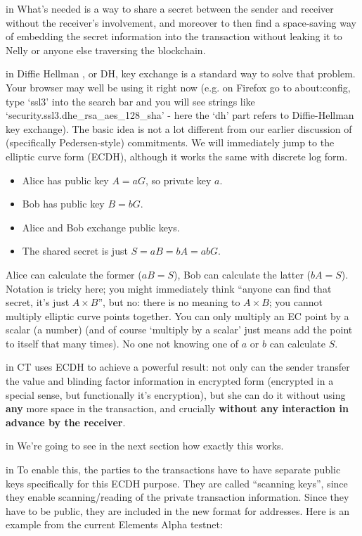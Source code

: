 \documentclass[10pt,a4paper]{article}
\begin{document}
 in \noindent What's needed is a way to share a secret between the sender and receiver without the receiver's involvement, and moreover to then find a space-saving way of embedding the secret information into the transaction without leaking it to Nelly or anyone else traversing the blockchain.

 in \noindent Diffie Hellman \cite{dhke}, or DH, key exchange is a standard way to solve that problem. Your browser may well be using it right now (e.g. on Firefox go to about:config, type `ssl3' into the search bar and you will see strings like `security.ssl3.dhe\_rsa\_aes\_128\_sha' - here the `dh' part refers to Diffie-Hellman key exchange). The basic idea is not a lot different from our earlier discussion of (specifically Pedersen-style) commitments. We will immediately jump to the elliptic curve form (ECDH), although it works the same with discrete log form.

\begin{itemize}
\item Alice has public key $A = aG$, so private key $a$.
\item Bob has public key $B = bG$.
\item Alice and Bob exchange public keys.
\item The shared secret is just $S = aB = bA = abG$.
\end{itemize}

Alice can calculate the former ($aB = S$), Bob can calculate the latter ($bA = S$). Notation is tricky here; you might immediately think ``anyone can find that secret, it's just $A \times B$'', but no: there is no meaning to $A \times B$; you cannot multiply elliptic curve points together. You can only multiply an EC point by a scalar (a number) (and of course `multiply by a scalar' just means add the point to itself that many times). No one not knowing one of $a$ or $b$ can calculate $S$.

 in \noindent CT uses ECDH to achieve a powerful result: not only can the sender transfer the value and blinding factor information in encrypted form (encrypted in a special sense, but functionally it's encryption), but she can do it without using \textbf{any} more space in the transaction, and crucially \textbf{without any interaction in advance by the receiver}.

 in \noindent We're going to see in the next section how exactly this works.

 in \noindent To enable this, the parties to the transactions have to have separate public keys specifically for this ECDH purpose. They are called ``scanning keys'', since they enable scanning/reading of the private transaction information. Since they have to be public, they are included in the new format for addresses. Here is an example from the current Elements Alpha testnet:
\end{document}
